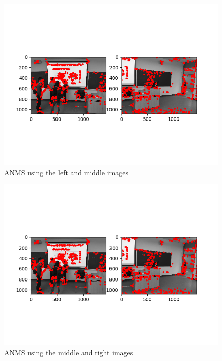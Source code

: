 \documentclass[10pt]{article}
\begin{document}
	\begin{figure}[h]
		\caption{ANMS using the left and middle images}
		\centering
		\includegraphics{ANMSl2m.png}
	\end{figure}
	
	\begin{figure}[h]
		\caption{ANMS using the middle and right images}
		\centering
		\includegraphics{ANMSl2m.png}
	\end{figure}
\end{document}
